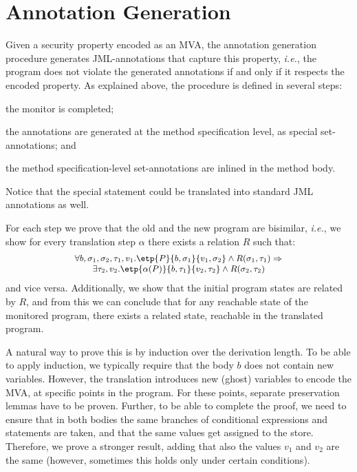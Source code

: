 \section{Annotation Generation}\label{SecAnnotGen}

Given a security property encoded as an MVA, the annotation generation
procedure generates JML-annotations that capture this property,
\emph{i.e.}, the program does not violate the generated annotations
if and only if it respects the encoded property.
As explained above, the procedure is defined in several steps:
\begin{inparaenum}
\item the monitor is completed; %
\item the annotations are generated at the method specification level,
as special set-annotations; and
\item the method specification-level set-annotations are inlined in
the method body.
\end{inparaenum}
Notice that the special \CaseJML statement could be translated into
standard JML annotations as well.

For each step we prove that the old and the new program are bisimilar,
\emph{i.e.}, we show for every translation step
\(\alpha\) there exists a relation \(R\) such that:
\[{\small
\begin{array}{l}
\forall b, \sigma_1, \sigma_2, \tau_1, v_1.
\etp{P}{b,\sigma_1}{v_1, \sigma_2} \wedge
R(\sigma_1, \tau_1) \Rightarrow \\
\qquad
\exists \tau_2, v_2.
\etp{\alpha(P)}{b, \tau_1}{v_2, \tau_2} \wedge
R(\sigma_2, \tau_2)
\end{array}}
\]
and vice versa. Additionally, we show that the initial program states
are related by \(R\), and from this we can conclude that for any
reachable state of the monitored program, there exists a related state,
reachable in the translated program.

A natural way to prove this is by induction over the derivation length.
To be able to apply induction, we typically require that the body \(b\) does
not contain new variables. However, the translation introduces new (ghost)
variables to encode the MVA, at specific points in the program. For
these points, separate preservation lemmas have to be proven.
Further, to be able to complete the proof, we need to ensure that in both
bodies the same branches of conditional expressions and statements are
taken, and that the same values get assigned to the store. Therefore,
we prove a stronger result, adding that also the values  %
\(v_1\) and \(v_2\) are the same (however, sometimes this holds only
under certain conditions).

